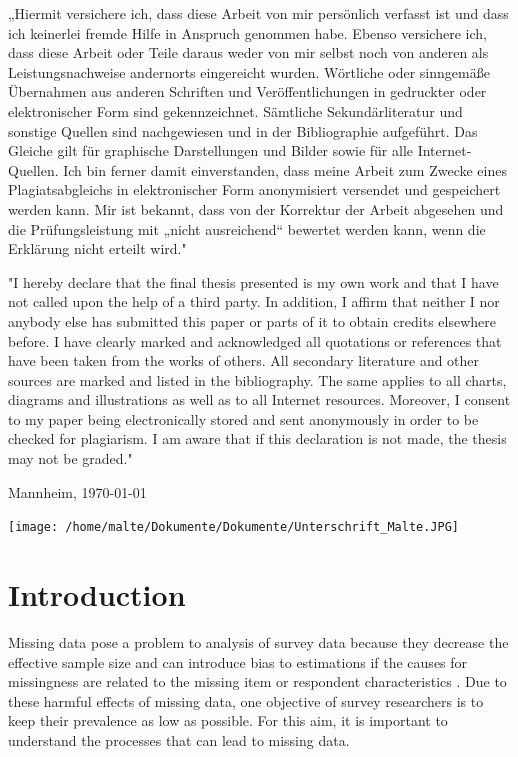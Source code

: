 \documentclass[a4paper,12pt]{article}
\begin{document}
„Hiermit versichere ich, dass diese Arbeit von mir persönlich verfasst ist
und dass ich keinerlei fremde Hilfe in Anspruch genommen habe. Ebenso
versichere ich, dass diese Arbeit oder Teile daraus weder von mir selbst
noch von anderen als Leistungsnachweise andernorts eingereicht wurden.
Wörtliche oder sinngemäße Übernahmen aus anderen Schriften und
Veröffentlichungen in gedruckter oder elektronischer Form sind
gekennzeichnet. Sämtliche Sekundärliteratur und sonstige Quellen sind
nachgewiesen und in der Bibliographie aufgeführt. Das Gleiche gilt für
graphische Darstellungen und Bilder sowie für alle Internet-Quellen. Ich
bin ferner damit einverstanden, dass meine Arbeit zum Zwecke eines
Plagiatsabgleichs in elektronischer Form anonymisiert versendet und
gespeichert werden kann. Mir ist bekannt, dass von der Korrektur der
Arbeit abgesehen und die Prüfungsleistung mit „nicht ausreichend“
bewertet werden kann, wenn die Erklärung nicht erteilt wird."
\bigskip

"I hereby declare that the final thesis presented is my own work and that I have not called upon the help of a third party. In addition, I affirm that neither I nor anybody else has submitted this paper or parts of it to obtain credits elsewhere before. I have clearly marked and acknowledged all quotations or references that have been taken from the works of others. All secondary literature  and  other  sources  are  marked  and  listed  in  the  bibliography.  The  same  applies  to  all charts, diagrams and illustrations as well as to all Internet resources. Moreover, I consent to my paper being electronically stored and sent anonymously in order to be checked for plagiarism. I am aware that if this declaration is not made, the thesis may not be graded."

\bigskip

Mannheim, \today

\bigskip
\texttt{[image: /home/malte/Dokumente/Dokumente/Unterschrift\_Malte.JPG]}
\newpage 

\section{Introduction}

Missing data pose a problem to analysis of survey data because they decrease the effective sample size and can introduce bias to estimations if the causes for missingness are related to the missing item or respondent characteristics \citep{deleeuwPreventionTreatmentItem2003}. Due to these harmful effects of missing data, one objective of survey researchers is to keep their prevalence as low as possible. For this aim, it is important to understand the processes that can lead to missing data.
\end{document}
